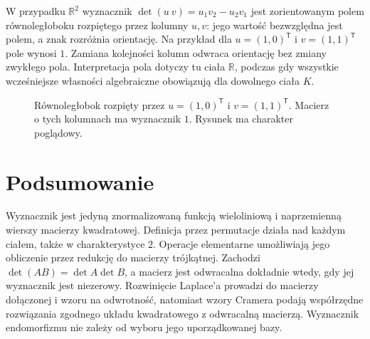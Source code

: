 \begin{uwaga}
\label{rem:lin6-geometria}
W przypadku \(\mathbb R^2\) wyznacznik
\(\det(u\ v)=u_1v_2-u_2v_1\)
jest zorientowanym polem równoległoboku
rozpiętego przez kolumny \(u,v\):
jego wartość bezwzględna jest polem,
a znak rozróżnia orientację.
Na przykład dla
\(u=(1,0)^{\mathsf T}\) i
\(v=(1,1)^{\mathsf T}\) pole wynosi \(1\).
Zamiana kolejności kolumn odwraca
orientację bez zmiany zwykłego pola.
Interpretacja pola dotyczy tu ciała
\(\mathbb R\), podczas gdy wszystkie
wcześniejsze własności algebraiczne
obowiązują dla dowolnego ciała \(K\).
\end{uwaga}

\begin{figure}[!htbp]
\centering
{}
\caption{Równoległobok rozpięty przez
\(u=(1,0)^{\mathsf T}\) i \(v=(1,1)^{\mathsf T}\).
Macierz o tych kolumnach ma wyznacznik \(1\).
Rysunek ma charakter poglądowy.}
\label{fig:lin6-rownoleglobok}
\end{figure}

\section{Podsumowanie}
\label{sec:lin6-podsumowanie}

Wyznacznik jest jedyną znormalizowaną
funkcją wieloliniową i naprzemienną
wierszy macierzy kwadratowej.
Definicja przez permutacje działa
nad każdym ciałem, także w charakterystyce \(2\).
Operacje elementarne umożliwiają jego
obliczenie przez redukcję do macierzy
trójkątnej. Zachodzi
\(\det(AB)=\det A\det B\),
a macierz jest odwracalna dokładnie
wtedy, gdy jej wyznacznik jest niezerowy.
Rozwinięcie Laplace'a prowadzi do
macierzy dołączonej i wzoru na odwrotność,
natomiast wzory Cramera podają
współrzędne rozwiązania zgodnego układu
kwadratowego z odwracalną macierzą.
Wyznacznik endomorfizmu nie zależy
od wyboru jego uporządkowanej bazy.
